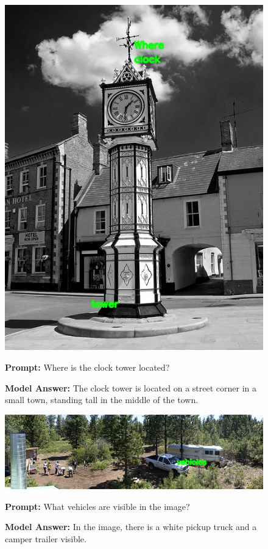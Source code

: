 \documentclass[11pt]{article}
\begin{document}
\begin{figure}[H]
    \centering
    \includegraphics[width=0.6\linewidth]{reordering_178.png}\par
    \vspace{1em}
    \raggedright
    \textbf{Prompt:} Where is the clock tower located?
    
    \textbf{Model Answer:} The clock tower is located on a street corner in a small town, standing tall in the middle of the town.
\end{figure}






\begin{figure}[H]
    \centering
    \includegraphics[width=0.9\linewidth]{reordering_263.png}\par
    \vspace{1em}
    \raggedright
    \textbf{Prompt:} What vehicles are visible in the image?
    
    \textbf{Model Answer:} In the image, there is a white pickup truck and a camper trailer visible.
    \label{fig:qwen_loss_plot}
\end{figure}
\end{document}
